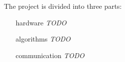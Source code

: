 \documentclass[documentation.tex]{subfiles}
\begin{document}
	The project is divided into three parts:
	\begin{itemize}
		\item[hardware] \textit{TODO} 
		\item[algorithms] \textit{TODO}
		\item[communication] \textit{TODO}
	\end{itemize}
\end{document}
